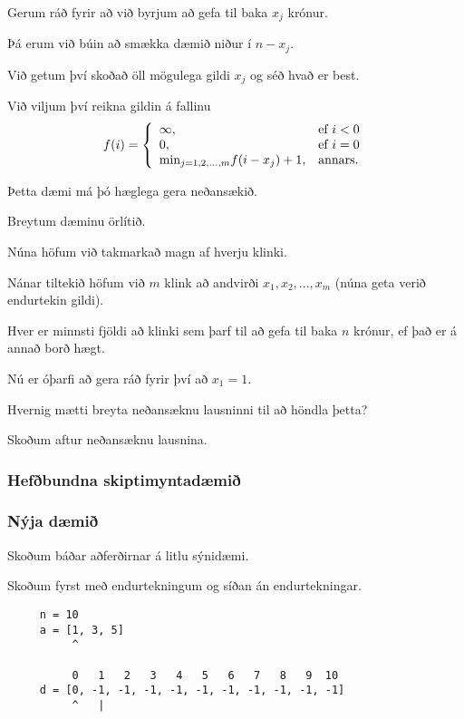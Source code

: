{
	{
		\item<1-> Gerum ráð fyrir að við byrjum að gefa til baka $x_j$ krónur.
		\item<2-> Þá erum við búin að smækka dæmið niður í $n - x_j$.
		\item<3-> Við getum því skoðað öll mögulega gildi $x_j$ og séð hvað er best.
		\item<4-> Við viljum því reikna gildin á fallinu
		\[
			f(i) = 
			\left \{
			\env{array}
			{
				{l l}
				\infty, & \text{ef $i < 0$}\\
				0, & \text{ef $i = 0$}\\
				\text{min}_{j = 1, 2, ..., m} f(i - x_j) + 1, & \text{annars}.
			}
			\right .
		\]
	}
}

{
}

{
	{
		\item<1-> Þetta dæmi má þó hæglega gera neðansækið.
	}
}

{
}

{
	{
		\item<1-> Breytum dæminu örlítið.
		\item<2-> Núna höfum við takmarkað magn af hverju klinki.
		\item<3-> Nánar tiltekið höfum við $m$ klink að andvirði $x_1, x_2, ..., x_m$ (núna geta verið endurtekin gildi).
		\item<4-> Hver er minnsti fjöldi að klinki sem þarf til að gefa til baka $n$ krónur, ef það er á annað borð hægt.
		\item<5-> Nú er óþarfi að gera ráð fyrir því að $x_1 = 1$.
		\item<6-> Hvernig mætti breyta neðansæknu lausninni til að höndla þetta?
		\item<7-> Skoðum aftur neðansæknu lausnina.
	}
}

{
	\frametitle{Hefðbundna skiptimyntadæmið}
}

{
	\frametitle{Nýja dæmið}
}

{
	{
		\item<1-> Skoðum báðar aðferðirnar á litlu sýnidæmi.
		\item<2-> Skoðum fyrst með endurtekningum og síðan án endurtekningar.
	}
}

\begin{frame}[fragile]
\begin{verbatim}
     n = 10
     a = [1, 3, 5]
          ^

          0   1   2   3   4   5   6   7   8   9  10
     d = [0, -1, -1, -1, -1, -1, -1, -1, -1, -1, -1]
          ^   |
\end{verbatim}
\end{frame}
\addtocounter{framenumber}{-1}

